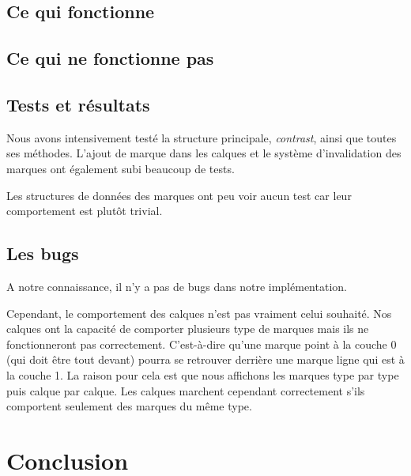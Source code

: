 \documentclass[12pt]{article}
\begin{document}
\subsection{Ce qui fonctionne}

\subsection{Ce qui ne fonctionne pas}

\subsection{Tests et résultats}

Nous avons intensivement testé la structure principale, \textit{contrast}, ainsi que toutes ses méthodes.
L'ajout de marque dans les calques et le système d'invalidation des marques ont également subi beaucoup de tests.

Les structures de données des marques ont peu voir aucun test car leur comportement
est plutôt trivial.

\subsection{Les bugs}

A notre connaissance, il n'y a pas de bugs dans notre implémentation.

Cependant, le comportement des calques n'est pas vraiment celui souhaité.
Nos calques ont la capacité de comporter plusieurs type de marques mais ils ne 
fonctionneront pas correctement. C'est-à-dire qu'une marque point à la couche 0 (qui 
doit être tout devant) pourra se retrouver derrière une marque ligne qui est à la couche 1.
La raison pour cela est que nous affichons les marques type par type puis calque par
calque.
Les  calques marchent cependant correctement s'ils comportent seulement des marques du même type.

\section{Conclusion}
\printglossaries
\printbibliography
\end{document}
